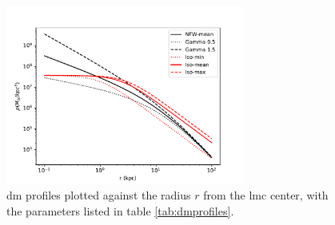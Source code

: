 \documentclass[main.tex]{subfiles}
\begin{document}
\begin{figure}
  \centering
  \includegraphics[width=0.7\textwidth]{Pictures/dmprofiles.pdf}
  \caption{\gls{dm} profiles plotted against the radius $r$ from the \gls{lmc} center, with the parameters listed in table \ref{tab:dmprofiles}.} \label{fig:dmprofiles}
\end{figure}

\begin{table}
  \centering
    \caption{Parameters of the \gls{dm} profiles used in this work. Values of NFW-mean and Iso-mean profiles are the same as of \cite{2015FermiLMCDM}. The $J$-factors are integrated in the \gls{fov} indicated by the last column.} \label{tab:dmprofiles}
\end{table}
\end{document}
